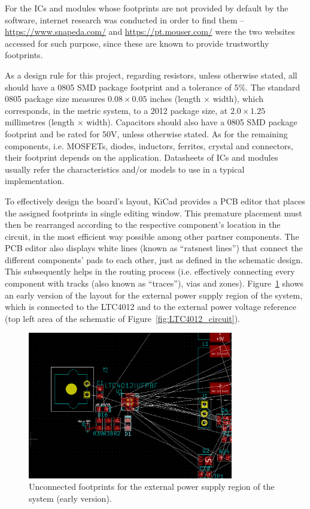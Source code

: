 For the ICs and modules whose footprints are not provided by default by the software, internet research was conducted in order to find them -- \url{https://www.snapeda.com/} and \url{https://pt.mouser.com/} were the two websites accessed for such purpose, since these are known to provide trustworthy footprints.

As a design rule for this project, regarding resistors, unless otherwise stated, all should have a 0805 \gls{SMD} package footprint and a tolerance of 5\%. The standard 0805 package size measures $0.08 \times 0.05$ inches (length $\times$ width), which corresponds, in the metric system, to a 2012 package size, at $2.0 \times 1.25$ millimetres (length $\times$ width).
Capacitors should also have a 0805 SMD package footprint and be rated for 50V, unless otherwise stated.
As for the remaining components, i.e. MOSFETs, diodes, inductors, ferrites, crystal and connectors, their footprint depends on the application.
Datasheets of ICs and modules usually refer the characteristics and/or models to use in a typical implementation.

To effectively design the board's layout, KiCad provides a PCB editor that places the assigned footprints in single editing window. This premature placement must then be rearranged according to the respective component's location in the circuit, in the most efficient way possible among other partner components. The PCB editor also displays white lines (known as ``ratsnest lines'') that connect the different components' pads to each other, just as defined in the schematic design. This subsequently helps in the routing process (i.e. effectively connecting every component with tracks (also known as ``traces''), vias and zones). Figure~\ref{fig:ratsnest} shows an early version of the layout for the external power supply region of the system, which is connected to the LTC4012 and to the external power voltage reference (top left area of the schematic of Figure~\ref{fig:LTC4012_circuit}).

\begin{figure}[h]
	\centering
	\includegraphics[width=0.8\textwidth]{Chapters/Figures/chapter5/ratsnest.png}
	\caption{Unconnected footprints for the external power supply region of the system (early version).}
	\label{fig:ratsnest}
\end{figure}


